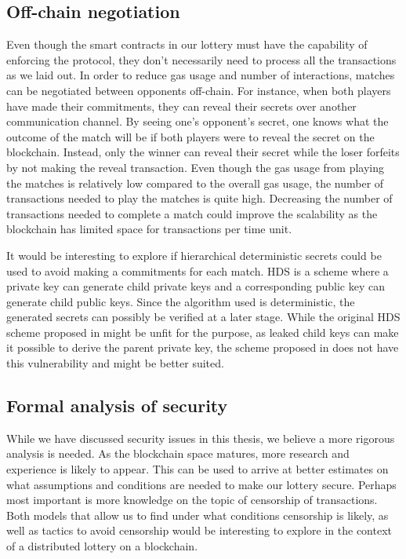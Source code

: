 \subsection{Off-chain negotiation}

Even though the smart contracts in our lottery must have the capability of enforcing the protocol, they don't necessarily need to process all the transactions as we laid out. In order to reduce gas usage and number of interactions, matches can be negotiated between opponents off-chain. For instance, when both players have made their commitments, they can reveal their secrets over another communication channel. By seeing one's opponent's secret, one knows what the outcome of the match will be if both players were to reveal the secret on the blockchain. Instead, only the winner can reveal their secret while the loser forfeits by not making the reveal transaction. Even though the gas usage from playing the matches is relatively low compared to the overall gas usage, the number of transactions needed to play the matches is quite high. Decreasing the number of transactions needed to complete a match could improve the scalability as the blockchain has limited space for transactions per time unit.

It would be interesting to explore if hierarchical deterministic secrets could be used to avoid making a commitments for each match. HDS is a scheme where a private key can generate child private keys and a corresponding public key can generate child public keys. Since the algorithm used is deterministic, the generated secrets can possibly be verified at a later stage. While the original HDS scheme proposed in \cite{wuille_bitcoin_2012} might be unfit for the purpose, as leaked child keys can make it possible to derive the parent private key, the scheme proposed in \cite{gutoski_hierarchical_2015} does not have this vulnerability and might be better suited.

\subsection{Formal analysis of security}

While we have discussed security issues in this thesis, we believe a more rigorous analysis is needed. As the blockchain space matures, more research and experience is likely to appear. This can be used to arrive at better estimates on what assumptions and conditions are needed to make our lottery secure. Perhaps most important is more knowledge on the topic of censorship of transactions. Both models that allow us to find under what conditions censorship is likely, as well as tactics to avoid censorship would be interesting to explore in the context of a distributed lottery on a blockchain.
